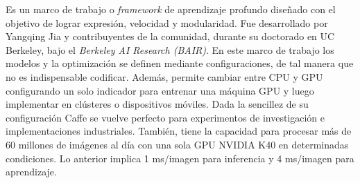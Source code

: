 Es un marco de trabajo o \textit{framework} de aprendizaje profundo diseñado con el objetivo de lograr expresión, velocidad y modularidad. Fue desarrollado por Yangqing Jia y contribuyentes de la comunidad, durante su doctorado en UC Berkeley, bajo el \textit{Berkeley AI Research (BAIR)}. En este marco de trabajo los modelos y la optimización se definen mediante configuraciones, de tal manera que no es indispensable codificar. Además, permite cambiar entre CPU y GPU configurando un solo indicador para entrenar una máquina GPU y luego implementar en clústeres o dispositivos móviles. Dada la sencillez de su configuración Caffe se vuelve perfecto para experimentos de investigación e implementaciones industriales. También, tiene la capacidad para procesar más de 60 millones de imágenes al día con una sola GPU NVIDIA K40 en determinadas condiciones. Lo anterior implica 1 ms/imagen para inferencia y 4 ms/imagen para aprendizaje. \cite{Caffe}


